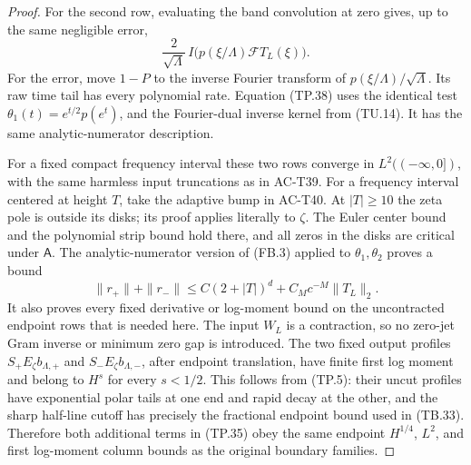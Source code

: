 \begin{proof}
For the second row, evaluating the band convolution
at zero gives, up to the same negligible error,
\[
          \frac2{\sqrt{\Lambda}}\,
                 I\bigl(p(\xi/\Lambda)\mathcal F T_L(\xi)\bigr).
 \tag{TP.38}
\]
For the error, move \(1-P\) to the inverse Fourier
transform of \(p(\xi/\Lambda)/\sqrt{\Lambda}\).
Its raw time tail has every polynomial rate.
Equation (TP.38) uses the identical test
\(\theta_1(t)=e^{t/2}p(e^t)\), and the Fourier-dual
inverse kernel from (TU.14).  It has the same
analytic-numerator description.

For a fixed compact frequency interval these two
rows converge in \(L^2((-\infty,0])\), with the
same harmless input truncations as in AC-T39.
For a frequency interval centered at height \(T\),
take the adaptive bump in AC-T40.
At \(|T|\geq10\) the zeta pole is outside its
disks; its proof applies literally to \(\zeta\).
The Euler center bound and the polynomial strip
bound hold there, and all zeros in the disks
are critical under \(\mathsf A\).
The analytic-numerator version of (FB.3) applied
to \(\theta_1,\theta_2\) proves a bound
\[
       \|r_+\|+\|r_-\|\leq C(2+|T|)^d
             +C_Mc^{-M}\|T_L\|_2 .
 \tag{TP.39}
\]
It also proves every fixed derivative or log-moment
bound on the uncontracted endpoint rows that is
needed here.  The input \(W_L\) is a contraction,
so no zero-jet Gram inverse or minimum zero gap
is introduced.  The two fixed output profiles
\(S_+E_\zeta b_{\Lambda,+}\) and
\(S_-E_\zeta b_{\Lambda,-}\), after endpoint
translation, have finite first log moment and
belong to \(H^s\) for every \(s<1/2\).
This follows from (TP.5): their uncut profiles
have exponential polar tails at one end and
rapid decay at the other, and the sharp half-line
cutoff has precisely the fractional endpoint
bound used in (TB.33).
Therefore both additional terms in (TP.35) obey
the same endpoint \(H^{1/4}\), \(L^2\), and first
log-moment column bounds as the original boundary
families.


\end{proof}
